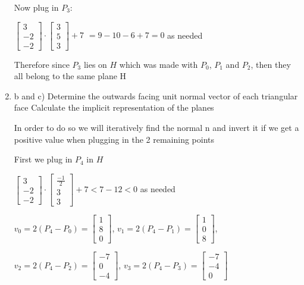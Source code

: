 \documentclass{article}
\begin{document}
\begin{enumerate}
        Now plug in $P_3$:

        $\begin{bmatrix} 3 \\ -2 \\ -2 \end{bmatrix} \cdot \begin{bmatrix} 3 \\ 5 \\ 3 \end{bmatrix} + 7 $
        $ = 9 - 10 - 6 + 7 = 0$ as needed
        
        Therefore since $P_3$ lies on $H$ which was made with $P_0$, $P_1$ and $P_2$, then they all belong to the same plane H

        \item b and c) Determine the outwards facing unit normal vector of each triangular face Calculate the implicit representation of the planes
        
        In order to do so we will iteratively find the normal n and invert it if we get a positive value when plugging in the 2 remaining points
        
        First we plug in $P_4$ in $H$

        $\begin{bmatrix} 3 \\ -2 \\ -2 \end{bmatrix} \cdot \begin{bmatrix} \frac{-1}{2} \\ 3 \\ 3 \end{bmatrix} + 7 < 7 - 12 < 0$ as needed


        $v_0 = 2(P_4 - P_0) = \begin{bmatrix} 1 \\ 8 \\ 0 \end{bmatrix}$,
        $v_1 = 2(P_4 - P_1) = \begin{bmatrix} 1  \\ 0 \\ 8 \end{bmatrix}$,

        $v_2 = 2(P_4 - P_2) = \begin{bmatrix} -7 \\ 0 \\ -4 \end{bmatrix}$,
        $v_3 = 2(P_4 - P_3) = \begin{bmatrix} -7 \\ -4 \\ 0 \end{bmatrix}$



\end{enumerate}
\end{document}
